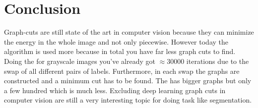 \documentclass[runningheads,a4paper]{llncs}
\begin{document}
   
\section{Conclusion}
    Graph-cuts are still state of the art in computer vision because they can minimize the energy in the whole image and not only piecewise.
    However today the \aexp algorithm is used more because in total you have far less graph cuts to find. 
    Doing the \abswap for grayscale images you've already got $\approx 30000$ iterations due to the swap of all different pairs of labels. Furthermore, in each swap
    the graphs are constructed and a minimum cut has to be found. The \aexp has bigger graphs but only a few hundred which is much less.
    Excluding deep learning graph cuts in computer vision are still a very interesting topic for doing task like segmentation.

\printbibliography
\end{document}
